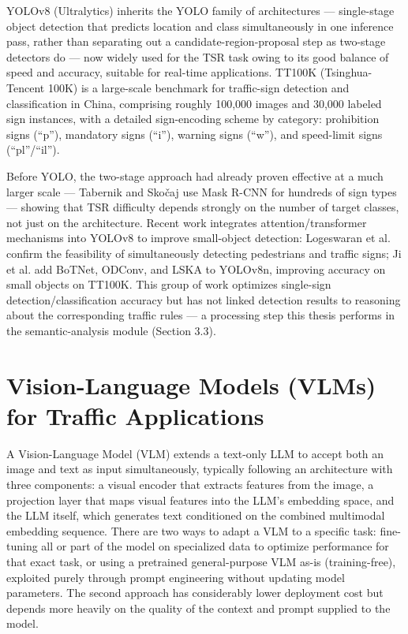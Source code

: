 \documentclass[12pt,a4paper]{report}
\begin{document}
YOLOv8 (Ultralytics) inherits the YOLO family of architectures --- single-stage object detection that predicts location and class simultaneously in one inference pass, rather than separating out a candidate-region-proposal step as two-stage detectors do \cite{redmon2016yolo} --- now widely used for the TSR task owing to its good balance of speed and accuracy, suitable for real-time applications. TT100K (Tsinghua-Tencent 100K) \cite{zhu2016tt100k} is a large-scale benchmark for traffic-sign detection and classification in China, comprising roughly 100,000 images and 30,000 labeled sign instances, with a detailed sign-encoding scheme by category: prohibition signs (``p''), mandatory signs (``i''), warning signs (``w''), and speed-limit signs (``pl''/``il'').

Before YOLO, the two-stage approach had already proven effective at a much larger scale --- Tabernik and Sko{\v c}aj \cite{tabernik2020largescale} use Mask R-CNN for hundreds of sign types --- showing that TSR difficulty depends strongly on the number of target classes, not just on the architecture. Recent work integrates attention/transformer mechanisms into YOLOv8 to improve small-object detection: Logeswaran et al. \cite{logeswaran2024pedestrian} confirm the feasibility of simultaneously detecting pedestrians and traffic signs; Ji et al. \cite{ji2024improvedyolov8} add BoTNet, ODConv, and LSKA to YOLOv8n, improving accuracy on small objects on TT100K. This group of work optimizes single-sign detection/classification accuracy but has not linked detection results to reasoning about the corresponding traffic rules --- a processing step this thesis performs in the semantic-analysis module (Section 3.3).

\section{Vision-Language Models (VLMs) for Traffic Applications}

A Vision-Language Model (VLM) extends a text-only LLM to accept both an image and text as input simultaneously, typically following an architecture with three components: a visual encoder that extracts features from the image, a projection layer that maps visual features into the LLM's embedding space, and the LLM itself, which generates text conditioned on the combined multimodal embedding sequence. There are two ways to adapt a VLM to a specific task: fine-tuning all or part of the model on specialized data to optimize performance for that exact task, or using a pretrained general-purpose VLM as-is (training-free), exploited purely through prompt engineering without updating model parameters. The second approach has considerably lower deployment cost but depends more heavily on the quality of the context and prompt supplied to the model.
\end{document}
